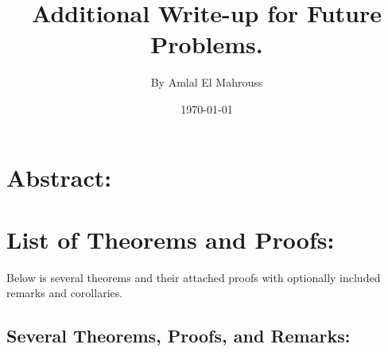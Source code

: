 \documentclass[10pt]{article}
\title{%
	\vspace{-1.5em}%
	\large\textbf{Additional Write-up for Future Problems.}%
}
\author{By Amlal El Mahrouss}
\date{\today}
\theoremstyle{plain}
\theoremstyle{definition}
\theoremstyle{remark}
\begin{document}

\maketitle
\tableofcontents
\newpage

\section{Abstract:}

\section{List of Theorems and Proofs:}

Below is several theorems and their attached proofs with optionally included remarks and corollaries.

\subsection{Several Theorems, Proofs, and Remarks:}
\end{document}
